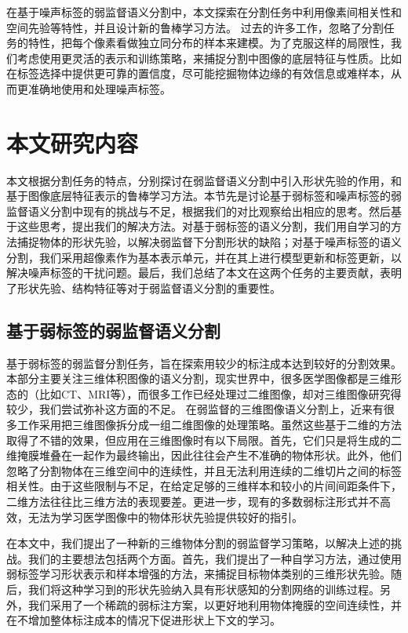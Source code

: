 在基于噪声标签的弱监督语义分割中，本文探索在分割任务中利用像素间相关性和空间先验等特性，并且设计新的鲁棒学习方法。
过去的许多工作，忽略了分割任务的特性，把每个像素看做独立同分布的样本来建模。为了克服这样的局限性，我们考虑使用更灵活的表示和训练策略，来捕捉分割中图像的底层特征与性质。比如在标签选择中提供更可靠的置信度，尽可能挖掘物体边缘的有效信息或难样本，从而更准确地使用和处理噪声标签。


\section{本文研究内容}
本文根据分割任务的特点，分别探讨在弱监督语义分割中引入形状先验的作用，和基于图像底层特征表示的鲁棒学习方法。本节先是讨论基于弱标签和噪声标签的弱监督语义分割中现有的挑战与不足，根据我们的对比观察给出相应的思考。然后基于这些思考，提出我们的解决方法。对基于弱标签的语义分割，我们用自学习的方法捕捉物体的形状先验，以解决弱监督下分割形状的缺陷；对基于噪声标签的语义分割，我们采用超像素作为基本表示单元，并在其上进行模型更新和标签更新，以解决噪声标签的干扰问题。最后，我们总结了本文在这两个任务的主要贡献，表明了形状先验、结构特征等对于弱监督语义分割的重要性。

\subsection{基于弱标签的弱监督语义分割}
基于弱标签的弱监督分割任务，旨在探索用较少的标注成本达到较好的分割效果。本部分主要关注三维体积图像的语义分割，现实世界中，很多医学图像都是三维形态的（比如CT、MRI等），而很多工作已经处理过二维图像，却对三维图像研究得较少，我们尝试弥补这方面的不足。
在弱监督的三维图像语义分割上，近来有很多工作采用把三维图像拆分成一组二维图像的处理策略。虽然这些基于二维的方法取得了不错的效果，但应用在三维图像时有以下局限。首先，它们只是将生成的二维掩膜堆叠在一起作为最终输出，因此往往会产生不准确的物体形状\citep{kervadec2019constrained,kervadec2020bounding}。此外，他们忽略了分割物体在三维空间中的连续性，并且无法利用连续的二维切片之间的标签相关性。由于这些限制与不足，在给定足够的三维样本和较小的片间间距条件下\citep{baumgartner2017exploration}，二维方法往往比三维方法的表现要差。更进一步，现有的多数弱标注形式并不高效，无法为学习医学图像中的物体形状先验提供较好的指引。

在本文中，我们提出了一种新的三维物体分割的弱监督学习策略，以解决上述的挑战。我们的主要想法包括两个方面。首先，我们提出了一种自学习方法，通过使用弱标签学习形状表示和样本增强的方法，来捕捉目标物体类别的三维形状先验。随后，我们将这种学习到的形状先验纳入具有形状感知的分割网络的训练过程。另外，我们采用了一个稀疏的弱标注方案，以更好地利用物体掩膜的空间连续性，并在不增加整体标注成本的情况下促进形状上下文的学习。

